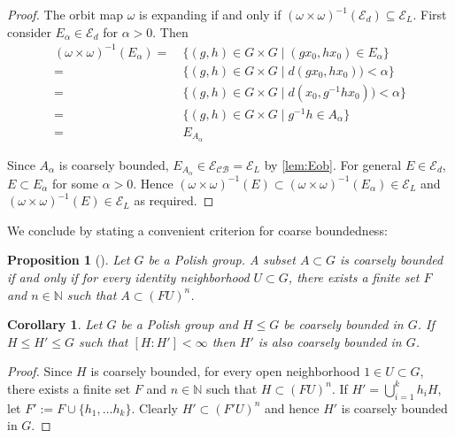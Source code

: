 \documentclass[twoside]{amsart}
\theoremstyle{plain}
\newtheorem{proposition}[theorem]{Proposition}
\newtheorem{corollary}[theorem]{Corollary}
\theoremstyle{break}
\theoremstyle{definition}
\theoremstyle{remark}
\newcommand{\N}{\mathbb{N}}
\begin{document}
\begin{proof}
    The orbit map $\omega$ is expanding if and 
    only if $(\omega\times\omega)^{-1}(\mathcal{E}_d)\subseteq\mathcal{E}_L$. 
    First consider $E_\alpha\in\mathcal{E}_d$ for $\alpha > 0$. Then 
    \begin{align*}
        (\omega\times\omega)^{-1}(E_\alpha)=&\ \{(g,h)\in G\times
        G\mid (g x_0,h x_0)\in E_\alpha\}\\ =&\
        \{(g,h)\in G\times G\mid d(g x_0,h
        x_0))<\alpha\}\\
        =&\ \{(g,h)\in G\times G\mid d(x_0,g^{-1}h x_0))<\alpha\}\\
        =&\ \{(g,h)\in G\times G\mid g^{-1}h\in A_\alpha\}\\
        =&\ E_{A_\alpha}
    \end{align*}

    Since $A_\alpha$ is coarsely bounded, $E_{A_\alpha} \in
    \mathcal{E}_{\mathcal{CB}} = \mathcal{E}_L$ by \cref{lem:Eob}.
    For general $E \in \mathcal{E}_d$, $E \subset E_\alpha$ for some
    $\alpha > 0$. Hence $(\omega \times \omega)^{-1}(E) \subset
    (\omega \times \omega)^{-1}(E_\alpha) \in \mathcal{E}_L$ and
    $(\omega \times \omega)^{-1}(E) \in \mathcal{E}_L$ as required.
  \end{proof}

We conclude by stating a convenient criterion for coarse
boundedness: 

\begin{proposition}[{\cite[Prop.~2.15(5)]{rosendal}}]
  \label{prop:ros_crit}
  Let $G$ be a Polish group.  A subset $A \subset G$ is coarsely
  bounded if and only if for every identity neighborhood $U \subset
  G$, there exists a finite set $F$ and $n \in \N$ such that $A
  \subset (FU)^n$.
\end{proposition}

\begin{corollary}\label{lem:fin_ext_cb}
    Let $G$ be a Polish group and $H\leq G$ be coarsely bounded in
    $G$. If $H\leq H'\leq G$ such that $[H:H']<\infty$ then $H'$ is
    also coarsely bounded in $G$.
\end{corollary}

\begin{proof}
    Since $H$ is coarsely bounded, for every open neighborhood $1\in
  U\subset G$, there exists a finite set $F$ and $n\in\N$ such that
$H\subset(FU)^n$. If $H'=\bigcup_{i=1}^k h_iH$, let
$F':=F\cup\{h_1,\ldots h_k\}$. Clearly $H'\subset(F'U)^n$ and hence
$H'$ is coarsely bounded in $G$. 
\end{proof}
\end{document}
